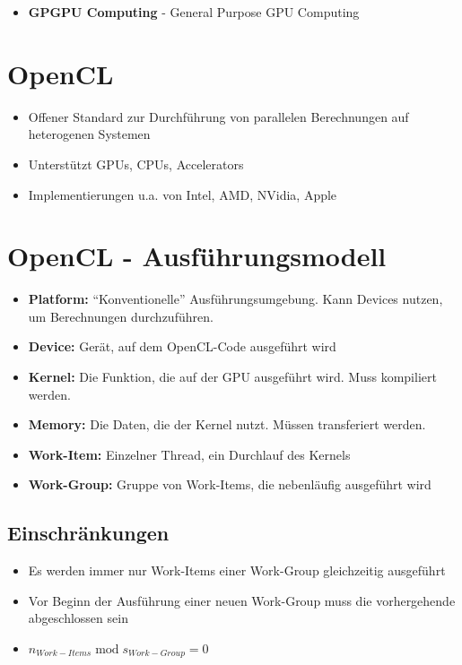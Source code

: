 \documentclass{article}
\begin{document}
\begin{itemize}
	\item \textbf{GPGPU Computing} - General Purpose GPU Computing
\end{itemize}

\section{OpenCL}

\begin{itemize}
	\item Offener Standard zur Durchführung von parallelen Berechnungen auf heterogenen Systemen
	\item Unterstützt GPUs, CPUs, Accelerators
	\item Implementierungen u.a. von Intel, AMD, NVidia, Apple
\end{itemize}

\section{OpenCL - Ausführungsmodell}

\begin{itemize}
	\item \textbf{Platform:} ``Konventionelle'' Ausführungsumgebung. Kann Devices nutzen, um Berechnungen durchzuführen.
	\item \textbf{Device:} Gerät, auf dem OpenCL-Code ausgeführt wird
	\item \textbf{Kernel:} Die Funktion, die auf der GPU ausgeführt wird. Muss kompiliert werden.
	\item \textbf{Memory:} Die Daten, die der Kernel nutzt. Müssen transferiert werden.
	\item \textbf{Work-Item:} Einzelner Thread, ein Durchlauf des Kernels
	\item \textbf{Work-Group:} Gruppe von Work-Items, die nebenläufig ausgeführt wird
\end{itemize}

\subsection{Einschränkungen}
\begin{itemize}
	\item Es werden immer nur Work-Items einer Work-Group gleichzeitig ausgeführt
	\item Vor Beginn der Ausführung einer neuen Work-Group muss die vorhergehende abgeschlossen sein
	\item $n_{Work-Items} \operatorname{mod} s_{Work-Group} = 0$	
\end{itemize}
\end{document}
